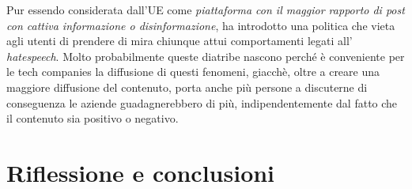 \documentclass{article}
\begin{document}
\begin{justify}
    Pur essendo considerata dall'UE come \textit{piattaforma con il maggior rapporto di post con cattiva informazione o disinformazione}, ha introdotto una politica che vieta agli utenti di prendere di mira chiunque attui comportamenti legati all' \textit{hatespeech}.
    Molto probabilmente queste diatribe nascono perché è conveniente per le tech companies la diffusione di questi fenomeni, giacchè, oltre a creare una maggiore diffusione del contenuto, porta anche più persone a discuterne di conseguenza le aziende guadagnerebbero di più, indipendentemente dal fatto che il contenuto sia positivo o negativo.
\end{justify}

\centering
\newpage\section{Riflessione e conclusioni}
\end{document}
